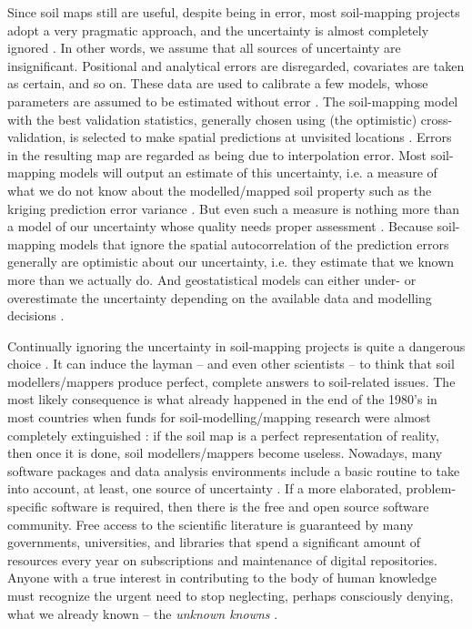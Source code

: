 Since soil maps still are useful, despite being in error, most soil-mapping projects adopt a very
pragmatic approach, and the uncertainty is almost completely ignored \cite{McBratneyEtAl2003,ScullEtAl2003}.
In other words, we assume that all sources of uncertainty are insignificant. 
Positional and analytical errors are disregarded, covariates are taken as certain, and so on. These 
data are used to calibrate a few models, whose parameters are assumed to be estimated without error 
\cite{DiggleEtAl1998}. The soil-mapping model with the best validation statistics, generally 
chosen using (the optimistic) cross-validation, is selected to make spatial predictions at unvisited
locations \cite{BrusEtAl2011}. Errors in the resulting map are regarded as being due to interpolation
error. Most soil-mapping models will output an estimate of this uncertainty, i.e. a measure of what 
we do not know about the modelled/mapped soil property such as the kriging prediction error variance
\cite{HeuvelinkEtAl1989}. But even such a measure is nothing more than a model of our uncertainty 
whose quality needs proper assessment \cite{Goovaerts2001}. Because soil-mapping models that ignore
the spatial autocorrelation of the prediction errors generally are optimistic about our uncertainty,
i.e. they estimate that we known more than we actually do. And geostatistical models can either 
under- or overestimate the uncertainty depending on the available data and modelling decisions 
\cite{Lark2000a}.

Continually ignoring the uncertainty in soil-mapping projects is quite a dangerous choice 
\cite{HeuvelinkEtAl1999}. It can induce the layman -- and even other scientists -- to think that 
soil modellers/mappers produce perfect, complete answers to soil-related issues. The most likely
consequence is what already happened in the end of the 1980's in most countries when funds for
soil-modelling/mapping research were almost completely extinguished 
\cite{Basher1997,Dalmolin1999,Ker1999,Ramos2003,HarteminkEtAl2008,Finke2012}: if the soil map is a perfect
representation of reality, then once it is done, soil modellers/mappers become useless. Nowadays, many 
software packages and data analysis environments include a basic routine to take into account, at 
least, one source of uncertainty \cite{ChristensenEtAl2002,Papritz2015,RibeiroJrEtAl2015}. If a 
more elaborated, problem-specific software is required, then there is the free and open source 
software community. Free access to the scientific literature is guaranteed by many governments, 
universities, and libraries that spend a significant amount of resources every year on subscriptions
and maintenance of digital repositories. Anyone with a true interest in contributing to the body of 
human knowledge must recognize the urgent need to stop neglecting, perhaps consciously denying, what
we already known -- the \emph{unknown knowns} \cite{Zizek2006}.

